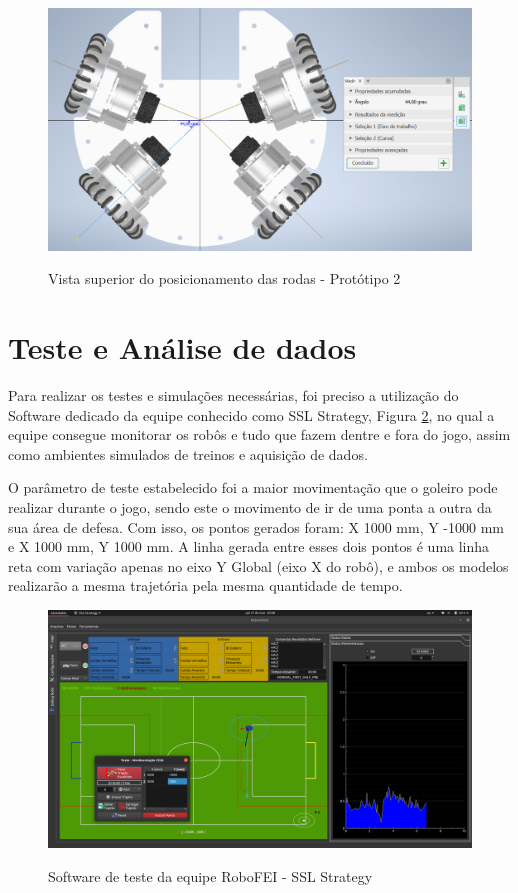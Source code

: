 \documentclass[deposito, acronym, symbols]{fei}
\begin{document}
\begin{figure}[!htb]
    \centering
    \caption{Vista superior do posicionamento das rodas - Protótipo 2}
    \includegraphics[scale=0.4]{Imagens/Vista superior do posicionamento das rodas - Proto 2.2.png}
    \label{fig:proto 2.2}
\end{figure}

\section{Teste e Análise de dados}

Para realizar os testes e simulações necessárias, foi preciso a utilização do Software dedicado da equipe conhecido como SSL Strategy, Figura \ref{fig:strategy}, no qual a equipe consegue monitorar os robôs e tudo que fazem dentre e fora do jogo, assim como ambientes simulados de treinos e aquisição de dados. 

O parâmetro de teste estabelecido foi a maior movimentação que o goleiro pode realizar durante o jogo, sendo este o movimento de ir de uma ponta a outra da sua área de defesa. Com isso, os pontos gerados foram: X 1000 mm, Y -1000 mm e X 1000 mm, Y 1000 mm. A linha gerada entre esses dois pontos é uma linha reta com variação apenas no eixo Y Global (eixo X do robô), e ambos os modelos realizarão a mesma trajetória pela mesma quantidade de tempo.

\begin{figure}[!htb]
    \centering
    \caption{Software de teste da equipe RoboFEI - SSL Strategy}
    \includegraphics[scale=0.2]{Imagens/ssl_strategy.png}
    \label{fig:strategy}
\end{figure}
\end{document}
